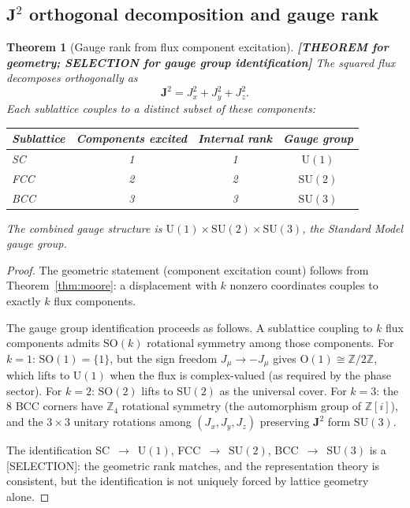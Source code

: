 \documentclass[11pt]{article}
\theoremstyle{tight}
\newtheorem{theorem}{Theorem}[section]
\theoremstyle{plainroman}
\newcommand{\Z}{\mathbb{Z}}
\begin{document}
\subsection{$\mathbf J^2$ orthogonal decomposition and gauge rank}

\begin{theorem}[Gauge rank from flux component excitation]\label{thm:gauge}
\textbf{[THEOREM for geometry; SELECTION for gauge group identification]}
The squared flux decomposes orthogonally as
\[
\mathbf J^2=J_x^2+J_y^2+J_z^2.
\]
Each sublattice couples to a distinct subset of these components:
\begin{center}
\renewcommand{\arraystretch}{1.2}
\begin{tabular}{lccc}
\toprule
\textbf{Sublattice} & \textbf{Components excited} & \textbf{Internal rank} & \textbf{Gauge group} \\
\midrule
SC & 1 & 1 & $\mathrm{U}(1)$ \\
FCC & 2 & 2 & $\mathrm{SU}(2)$ \\
BCC & 3 & 3 & $\mathrm{SU}(3)$ \\
\bottomrule
\end{tabular}
\end{center}
The combined gauge structure is $\mathrm{U}(1)\times\mathrm{SU}(2)\times\mathrm{SU}(3)$, the Standard Model gauge group.
\end{theorem}
\begin{proof}
The geometric statement (component excitation count) follows from Theorem~\ref{thm:moore}: a displacement with $k$ nonzero coordinates couples to exactly $k$ flux components.

The gauge group identification proceeds as follows.
A sublattice coupling to $k$ flux components admits $\mathrm{SO}(k)$ rotational symmetry among those components.
For $k=1$: $\mathrm{SO}(1)=\{1\}$, but the sign freedom $J_\mu\to -J_\mu$ gives $\mathrm{O}(1)\cong\Z/2\Z$, which lifts to $\mathrm{U}(1)$ when the flux is complex-valued (as required by the phase sector).
For $k=2$: $\mathrm{SO}(2)$ lifts to $\mathrm{SU}(2)$ as the universal cover.
For $k=3$: the 8 BCC corners have $\Z_4$ rotational symmetry (the automorphism group of $\Z[i]$), and the $3\times 3$ unitary rotations among $(J_x,J_y,J_z)$ preserving $\mathbf J^2$ form $\mathrm{SU}(3)$.

The identification SC~$\to$~$\mathrm{U}(1)$, FCC~$\to$~$\mathrm{SU}(2)$, BCC~$\to$~$\mathrm{SU}(3)$ is a [SELECTION]: the geometric rank matches, and the representation theory is consistent, but the identification is not uniquely forced by lattice geometry alone.
\end{proof}
\end{document}
